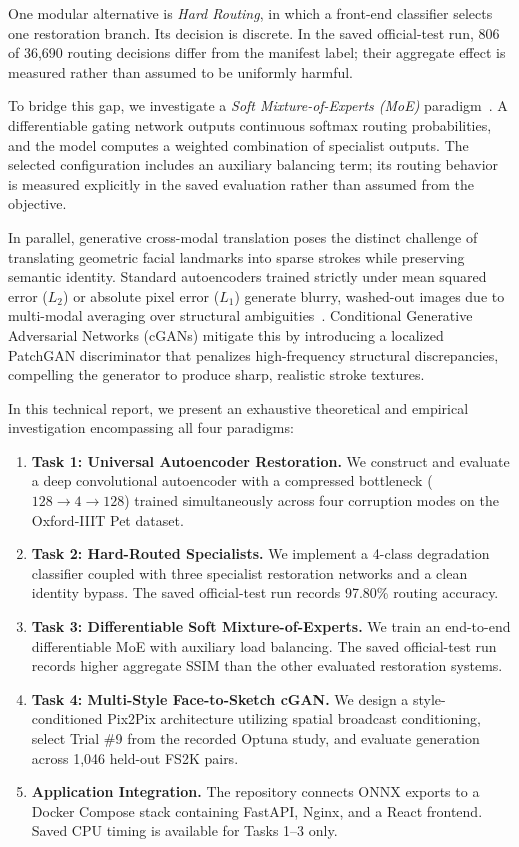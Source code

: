 \documentclass[journal,compsoc]{IEEEtran}
\begin{document}
One modular alternative is \textit{Hard Routing}, in which a front-end classifier selects one restoration branch. Its decision is discrete. In the saved official-test run, 806 of 36,690 routing decisions differ from the manifest label; their aggregate effect is measured rather than assumed to be uniformly harmful.

To bridge this gap, we investigate a \textit{Soft Mixture-of-Experts (MoE)} paradigm~\cite{jacobs1991adaptive, shazeer2017outrageously, fedus2022switch}. A differentiable gating network outputs continuous softmax routing probabilities, and the model computes a weighted combination of specialist outputs. The selected configuration includes an auxiliary balancing term; its routing behavior is measured explicitly in the saved evaluation rather than assumed from the objective.

In parallel, generative cross-modal translation poses the distinct challenge of translating geometric facial landmarks into sparse strokes while preserving semantic identity. Standard autoencoders trained strictly under mean squared error ($L_2$) or absolute pixel error ($L_1$) generate blurry, washed-out images due to multi-modal averaging over structural ambiguities~\cite{isola2017image}. Conditional Generative Adversarial Networks (cGANs) mitigate this by introducing a localized PatchGAN discriminator that penalizes high-frequency structural discrepancies, compelling the generator to produce sharp, realistic stroke textures.

In this technical report, we present an exhaustive theoretical and empirical investigation encompassing all four paradigms:
\begin{enumerate}
    \item \textbf{Task 1: Universal Autoencoder Restoration.} We construct and evaluate a deep convolutional autoencoder with a compressed bottleneck ($128 \to 4 \to 128$) trained simultaneously across four corruption modes on the Oxford-IIIT Pet dataset.
    \item \textbf{Task 2: Hard-Routed Specialists.} We implement a 4-class degradation classifier coupled with three specialist restoration networks and a clean identity bypass. The saved official-test run records 97.80\% routing accuracy.
    \item \textbf{Task 3: Differentiable Soft Mixture-of-Experts.} We train an end-to-end differentiable MoE with auxiliary load balancing. The saved official-test run records higher aggregate SSIM than the other evaluated restoration systems.
    \item \textbf{Task 4: Multi-Style Face-to-Sketch cGAN.} We design a style-conditioned Pix2Pix architecture utilizing spatial broadcast conditioning, select Trial \#9 from the recorded Optuna study, and evaluate generation across 1,046 held-out FS2K pairs.
    \item \textbf{Application Integration.} The repository connects ONNX exports to a Docker Compose stack containing FastAPI, Nginx, and a React frontend. Saved CPU timing is available for Tasks 1--3 only.
\end{enumerate}
\end{document}
